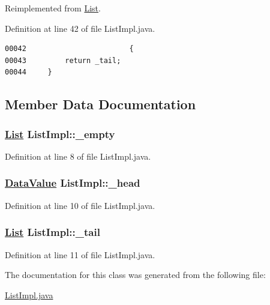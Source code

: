 Reimplemented from \hyperlink{interfaceList_a1}{List}.

Definition at line 42 of file List\-Impl.java.\footnotesize\begin{verbatim}00042                        {
00043         return _tail;
00044     }
\end{verbatim}\normalsize 


\subsection{Member Data Documentation}
\hypertarget{classListImpl_r0}{
\subsubsection[\_\-empty]{\setlength{\rightskip}{0pt plus 5cm}\hyperlink{interfaceList}{List} List\-Impl::\_\-empty}}
\label{classListImpl_r0}




Definition at line 8 of file List\-Impl.java.\hypertarget{classListImpl_o0}{
\subsubsection[\_\-head]{\setlength{\rightskip}{0pt plus 5cm}\hyperlink{interfaceDataValue}{Data\-Value} List\-Impl::\_\-head}}
\label{classListImpl_o0}




Definition at line 10 of file List\-Impl.java.\hypertarget{classListImpl_o1}{
\subsubsection[\_\-tail]{\setlength{\rightskip}{0pt plus 5cm}\hyperlink{interfaceList}{List} List\-Impl::\_\-tail}}
\label{classListImpl_o1}




Definition at line 11 of file List\-Impl.java.

The documentation for this class was generated from the following file:\begin{CompactItemize}
\item 
\hyperlink{ListImpl_8java-source}{List\-Impl.java}\end{CompactItemize}
